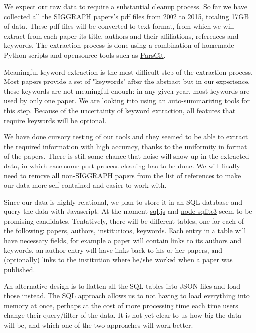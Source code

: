 We expect our raw data to require a substantial cleanup process. So far we have collected all the SIGGRAPH papers's pdf files from 2002 to 2015, totaling 17GB of data. These pdf files will be converted to text format, from which we will extract from each paper its title, authors and their affiliations, references and keywords. The extraction process is done using a combination of homemade Python scripts and opensource tools such as \href{http://aye.comp.nus.edu.sg/parsCit/}{ParsCit}.

Meaningful keyword extraction is the most difficult step of the extraction process. Most papers provide a set of "keywords" after the abstract but in our experience, these keywords are not meaningful enough: in any given year, most keywords are used by only one paper. We are looking into using an auto-summarizing tools for this step. Because of the uncertainty of keyword extraction, all features that require keywords will be optional.

We have done cursory testing of our tools and they seemed to be able to extract the required information with high accuracy, thanks to the uniformity in format of the papers. There is still some chance that noise will show up in the extracted data, in which case some post-process cleaning has to be done. We will finally need to remove all non-SIGGRAPH papers from the list of references to make our data more self-contained and easier to work with.

Since our data is highly relational, we plan to store it in an SQL database and query the data with Javascript. At the moment \href{https://github.com/kripken/sql.js/}{sql.js} and \href{https://github.com/mapbox/node-sqlite3}{node-sqlite3} seem to be promising candidates. Tentatively, there will be different tables, one for each of the following: papers, authors, institutions, keywords. Each entry in a table will have necessary fields, for example a paper will contain links to its authors and keywords, an author entry will have links back to his or her papers, and (optionally) links to the institution where he/she worked when a paper was published.

An alternative design is to flatten all the SQL tables into JSON files and load those instead. The SQL approach allows us to not having to load everything into memory at once, perhaps at the cost of more processing time each time users change their query/filter of the data. It is not yet clear to us how big the data will be, and which one of the two approaches will work better.

